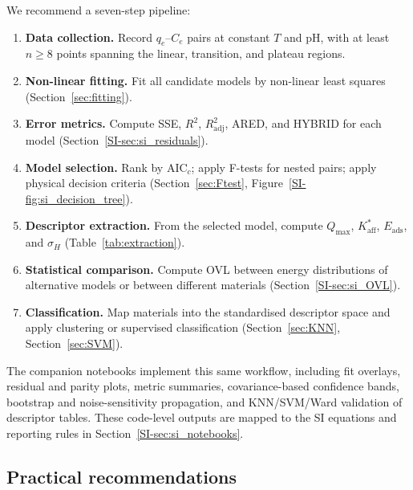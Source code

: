 \documentclass[journal=jacsat,manuscript=article]{achemso}
\begin{document}
	We recommend a seven-step pipeline:
	\begin{enumerate}
		\item \textbf{Data collection.} Record $q_e$--$C_e$ pairs at constant $T$ and pH, with at least $n \geq 8$ points spanning the linear, transition, and plateau regions.
		\item \textbf{Non-linear fitting.} Fit all candidate models by non-linear least squares (Section~\ref{sec:fitting}).
		\item \textbf{Error metrics.} Compute SSE, $R^2$, $R^2_{\mathrm{adj}}$, ARED, and HYBRID for each model (Section~\ref{SI-sec:si_residuals}).
		\item \textbf{Model selection.} Rank by AIC$_c$; apply F-tests for nested pairs; apply physical decision criteria (Section~\ref{sec:Ftest}, Figure~\ref{SI-fig:si_decision_tree}).
		\item \textbf{Descriptor extraction.} From the selected model, compute $Q_{\max}$, $K_{\mathrm{aff}}^{\ast}$, $E_{\mathrm{ads}}$, and $\sigma_H$ (Table~\ref{tab:extraction}).
		\item \textbf{Statistical comparison.} Compute OVL between energy distributions of alternative models or between different materials (Section~\ref{SI-sec:si_OVL}).
		\item \textbf{Classification.} Map materials into the standardised descriptor space and apply clustering or supervised classification (Section~\ref{sec:KNN}, Section~\ref{sec:SVM}).
	\end{enumerate}
	The companion notebooks implement this same workflow, including fit overlays,
	residual and parity plots, metric summaries, covariance-based confidence
	bands, bootstrap and noise-sensitivity propagation, and KNN/SVM/Ward
	validation of descriptor tables. These code-level outputs are mapped to the
	SI equations and reporting rules in Section~\ref{SI-sec:si_notebooks}.

	\subsection{Practical recommendations}
	\label{sec:practical}
\end{document}
